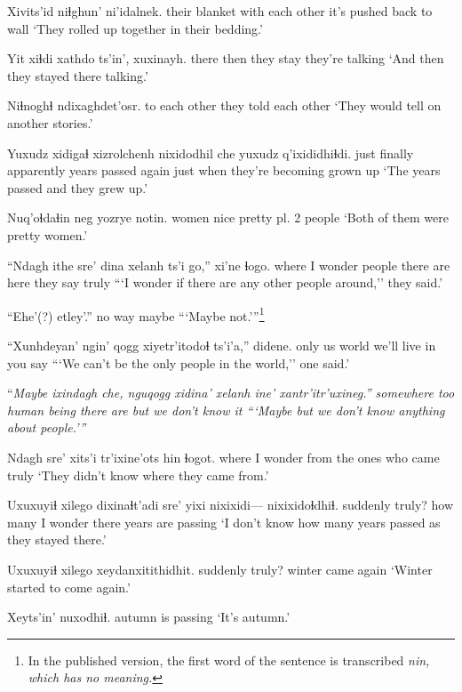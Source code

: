 \documentclass[12pt]{article}
\begin{document}
\gll Xivits'id niɬghun' ni'idalnek.
{their blanket} {with each other} {it's pushed back to wall}
\glt `They rolled up together in their bedding.'
\glend

\gll Yit xiɬdi xathdo ts'in', xuxinayh.
there then {they stay} {} {they're talking}
\glt `And then they stayed there talking.'
\glend

\gll Niɬnoghɬ ndixaghdet'osr.
{to each other} {they told each other}
\glt `They would tell on another stories.'
\glend

\gll Yuxudz xidigaɬ xizrolchenh nixidodhil che yuxudz q'ixididhiɬdi.
just finally apparently {years passed} again just {when they're becoming grown up}
\glt `The years passed and they grew up.'
\glend

\gll Nuq'oɬdaɬin neg yozrye notin.
women nice {pretty pl.} {2 people}
\glt `Both of them were pretty women.'
\glend

\gll ``Ndagh {ithe sre'} dina xelanh ts'i go,'' xi'ne ɬogo.
where {I wonder} people {there are} {} here {they say} truly
\glt ```I wonder if there are any other people around,'' they said.'
\glend

\gll ``Ehe'(?) etley'.''
{no way} maybe
\glt ```Maybe not.'''\footnote{In the published version, the first word of the sentence is transcribed \em nin, \em which has no meaning.}
\glend

\gll ``Xunhdeyan'  {ngin' qogg} xiyetr'itodoɬ ts'i'a,'' didene.
{only us} world {we'll live in} {} {you say}
\glt ```We can't be the only people in the world,'' one said.'
\glend

\gll ``\em Maybe ixindagh che, {nguqogg xidina'} xelanh ine' xantr'itr'uxineg.''
{} somewhere too {human being} {there are} but {we don't know it}
\glt ```Maybe but we don't know anything about people.'''
\glend

\gll Ndagh sre' xits'i {tr'ixine'ots hin} ɬogot.
where {I wonder} from {the ones who came}  truly
\glt `They didn't know where they came from.'
\glend

\gll Uxuxuyiɬ xilego dixinaɬt'adi sre' yixi nixixidi--- nixixidoɬdhiɬ.
suddenly truly? {how many} {I wonder} there {} {years are passing}
\glt `I don't know how many years passed as they stayed there.'
\glend

\gll Uxuxuyiɬ xilego xeydanxitithidhit.
suddenly truly? {winter came again}
\glt `Winter started to come again.'
\glend

\gll Xeyts'in' nuxodhiɬ.
autumn {is passing}
\glt `It's autumn.'
\glend
\end{document}
